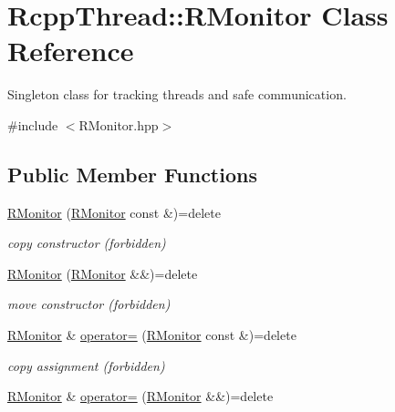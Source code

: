 \hypertarget{class_rcpp_thread_1_1_r_monitor}{}\section{Rcpp\+Thread\+:\+:R\+Monitor Class Reference}
\label{class_rcpp_thread_1_1_r_monitor}


Singleton class for tracking threads and safe communication.  




{\ttfamily \#include $<$R\+Monitor.\+hpp$>$}

\subsection*{Public Member Functions}
\begin{DoxyCompactItemize}
\item 
\hyperlink{class_rcpp_thread_1_1_r_monitor_a1abaa58edc53dba7d12773c5dee58651}{R\+Monitor} (\hyperlink{class_rcpp_thread_1_1_r_monitor}{R\+Monitor} const \&)=delete\hypertarget{class_rcpp_thread_1_1_r_monitor_a1abaa58edc53dba7d12773c5dee58651}{}\label{class_rcpp_thread_1_1_r_monitor_a1abaa58edc53dba7d12773c5dee58651}

\begin{DoxyCompactList}\small\item\em copy constructor (forbidden) \end{DoxyCompactList}\item 
\hyperlink{class_rcpp_thread_1_1_r_monitor_ab9baec1f5dbfe8a3349695bd6d9863e8}{R\+Monitor} (\hyperlink{class_rcpp_thread_1_1_r_monitor}{R\+Monitor} \&\&)=delete\hypertarget{class_rcpp_thread_1_1_r_monitor_ab9baec1f5dbfe8a3349695bd6d9863e8}{}\label{class_rcpp_thread_1_1_r_monitor_ab9baec1f5dbfe8a3349695bd6d9863e8}

\begin{DoxyCompactList}\small\item\em move constructor (forbidden) \end{DoxyCompactList}\item 
\hyperlink{class_rcpp_thread_1_1_r_monitor}{R\+Monitor} \& \hyperlink{class_rcpp_thread_1_1_r_monitor_a2073f46ded6bb67799d967faff17cd42}{operator=} (\hyperlink{class_rcpp_thread_1_1_r_monitor}{R\+Monitor} const \&)=delete\hypertarget{class_rcpp_thread_1_1_r_monitor_a2073f46ded6bb67799d967faff17cd42}{}\label{class_rcpp_thread_1_1_r_monitor_a2073f46ded6bb67799d967faff17cd42}

\begin{DoxyCompactList}\small\item\em copy assignment (forbidden) \end{DoxyCompactList}\item 
\hyperlink{class_rcpp_thread_1_1_r_monitor}{R\+Monitor} \& \hyperlink{class_rcpp_thread_1_1_r_monitor_a4677bdda0a35abaf288e66cf9dcd6032}{operator=} (\hyperlink{class_rcpp_thread_1_1_r_monitor}{R\+Monitor} \&\&)=delete\hypertarget{class_rcpp_thread_1_1_r_monitor_a4677bdda0a35abaf288e66cf9dcd6032}{}\label{class_rcpp_thread_1_1_r_monitor_a4677bdda0a35abaf288e66cf9dcd6032}


\end{DoxyCompactItemize}
